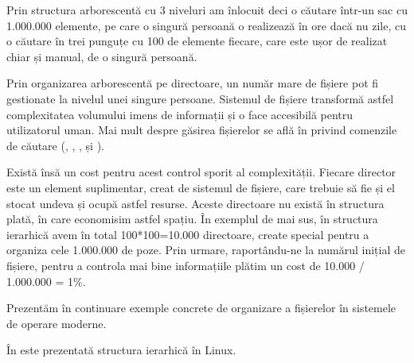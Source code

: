 Prin structura arborescentă cu 3 niveluri am înlocuit deci o căutare într-un sac cu 1.000.000 elemente, pe care o singură persoană o realizează în ore dacă nu zile, cu o căutare în trei punguțe cu 100 de elemente fiecare, care este ușor de realizat chiar și manual, de o singură persoană.

Prin organizarea arborescentă pe directoare, un număr mare de fișiere pot fi gestionate la nivelul unei singure persoane.
Sistemul de fișiere transformă astfel complexitatea volumului imens de informații și o face accesibilă pentru utilizatorul uman.
Mai mult despre găsirea fișierelor se află în  privind comenzile de căutare (, , ,  și ).

Există însă un cost pentru acest control sporit al complexității.
Fiecare director este un element suplimentar, creat de sistemul de fișiere, care trebuie să fie și el stocat undeva și ocupă astfel resurse.
Aceste directoare nu există în structura plată, în care economisim astfel spațiu.
În exemplul de mai sus, în structura ierarhică avem în total 100*100=10.000 directoare, create special pentru a organiza cele 1.000.000 de poze.
Prin urmare, raportându-ne la numărul inițial de fișiere, pentru a controla mai bine informațiile plătim un cost de 10.000 / 1.000.000 = 1\%.

Prezentăm în continuare exemple concrete de organizare a fișierelor în sistemele de operare moderne.

În  este prezentată structura ierarhică în Linux.

